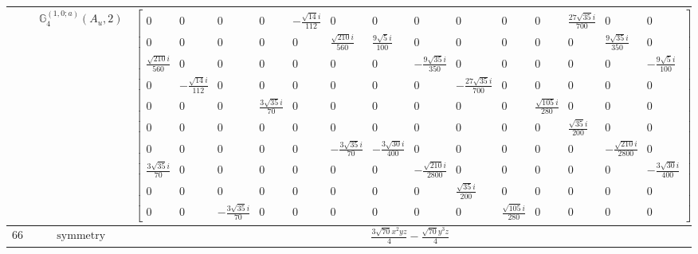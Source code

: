 \documentclass[fleqn,8pt,landscape]{jsarticle}
\begin{document}
\begin{longtable}{ccc}
$  $ & $ \mathbb{G}_{4}^{(1,0;a)}(A_{u},2) $ & $ \begin{bmatrix} 0 & 0 & 0 & 0 & - \frac{\sqrt{14} i}{112} & 0 & 0 & 0 & 0 & 0 & 0 & \frac{27 \sqrt{35} i}{700} & 0 & 0 \\ 0 & 0 & 0 & 0 & 0 & \frac{\sqrt{210} i}{560} & \frac{9 \sqrt{5} i}{100} & 0 & 0 & 0 & 0 & 0 & \frac{9 \sqrt{35} i}{350} & 0 \\ \frac{\sqrt{210} i}{560} & 0 & 0 & 0 & 0 & 0 & 0 & - \frac{9 \sqrt{35} i}{350} & 0 & 0 & 0 & 0 & 0 & - \frac{9 \sqrt{5} i}{100} \\ 0 & - \frac{\sqrt{14} i}{112} & 0 & 0 & 0 & 0 & 0 & 0 & - \frac{27 \sqrt{35} i}{700} & 0 & 0 & 0 & 0 & 0 \\ 0 & 0 & 0 & \frac{3 \sqrt{35} i}{70} & 0 & 0 & 0 & 0 & 0 & 0 & \frac{\sqrt{105} i}{280} & 0 & 0 & 0 \\ 0 & 0 & 0 & 0 & 0 & 0 & 0 & 0 & 0 & 0 & 0 & \frac{\sqrt{35} i}{200} & 0 & 0 \\ 0 & 0 & 0 & 0 & 0 & - \frac{3 \sqrt{35} i}{70} & - \frac{3 \sqrt{30} i}{400} & 0 & 0 & 0 & 0 & 0 & - \frac{\sqrt{210} i}{2800} & 0 \\ \frac{3 \sqrt{35} i}{70} & 0 & 0 & 0 & 0 & 0 & 0 & - \frac{\sqrt{210} i}{2800} & 0 & 0 & 0 & 0 & 0 & - \frac{3 \sqrt{30} i}{400} \\ 0 & 0 & 0 & 0 & 0 & 0 & 0 & 0 & \frac{\sqrt{35} i}{200} & 0 & 0 & 0 & 0 & 0 \\ 0 & 0 & - \frac{3 \sqrt{35} i}{70} & 0 & 0 & 0 & 0 & 0 & 0 & \frac{\sqrt{105} i}{280} & 0 & 0 & 0 & 0 \end{bmatrix} $ \\ \hline
$ 667 $ & $ \text{symmetry} $ & $ \frac{3 \sqrt{70} x^{2} y z}{4} - \frac{\sqrt{70} y^{3} z}{4} $ \\

\end{longtable}
\end{document}
